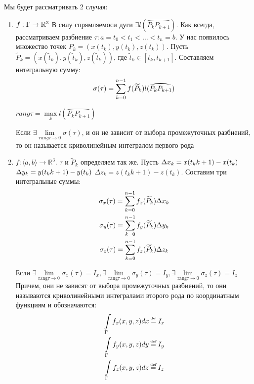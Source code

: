 Мы будет рассматривать 2 случая:
\begin{enumerate}
	\item
		$f: \Gamma \rightarrow \mathbb{R}^3\\$ 
		В силу спрямляемоси дуги $\exists l(\wideparen{P_k P_{k + 1}})$.
		Как всегда, рассматриваем разбиение $\tau: a = t_0 < t_1 < \dots < t_n = b$. 
		У нас появилось множество точек $P_k = (x(t_k), y(t_k), z(t_k))$.
		Пусть $\widetilde{P}_k = (x(\widetilde{t}_k), y(\widetilde{t}_k), z(\widetilde{t}_k))$, 
		где $\widetilde{t}_k \in [t_k, t_{k + 1}]$.
		Составляем интегральную сумму:
		\begin{gather}
			\sigma(\tau) = \sumlr{k = 0}{n - 1} f(\widetilde{P}_k)l(\wideparen{P_k P_{k + 1}})
		\end{gather}
		\begin{definition}
			$rang\tau = \max\limits_{k} l(\wideparen{P_k P_{k + 1}})$
		\end{definition}
		\begin{definition}
			Eсли $\exists \lim\limits_{rang\tau \rightarrow 0} \sigma(\tau)$, и он не зависит от 
			выбора промежуточных разбиений, то он называется криволинейным интегралом первого рода
		\end{definition}
	\item
		$f: \langle a, b \rangle \rightarrow \mathbb{R}^3$.
		$\tau$ и $\widetilde{P}_k$ определяем так же.
		Пусть $\Delta x_k = x(t_k{k + 1}) - x(t_k)\\$
		$\Delta y_k = y(t_k{k + 1}) - y(t_k)\\$
		$\Delta z_k = z(t_k{k + 1}) - z(t_k)$.
		Составим три интегральные суммы:
		\begin{gather}
			\sigma_x(\tau) = \sum\limits_{k = 0}^{n - 1}f_x(\widetilde{P}_k)\Delta x_k \\
			\sigma_y(\tau) = \sum\limits_{k = 0}^{n - 1}f_y(\widetilde{P}_k)\Delta y_k \\
			\sigma_z(\tau) = \sum\limits_{k = 0}^{n - 1}f_z(\widetilde{P}_k)\Delta z_k
		\end{gather}
		\begin{definition}
			Если $\exists \lim\limits_{\text{rang}\tau \rightarrow 0}\sigma_x(\tau) = I_x, 
			\exists \lim\limits_{\text{rang}\tau \rightarrow 0}\sigma_y(\tau) = I_y,
			\exists \lim\limits_{\text{rang}\tau \rightarrow 0}\sigma_z(\tau) = I_z$
			Причем, они не зависят от выбора промежуточных разбиений, 
			то они называются криволинейными интегралами второго рода по координатным функциям
			и обозначаются:
			\begin{gather*}
				\intl{\Gamma}f_x(x, y, z)dx \defeq I_x \\
				\intl{\Gamma}f_y(x, y, z)dy \defeq I_y \\
				\intl{\Gamma}f_z(x, y, z)dz \defeq I_z 
			\end{gather*}
		\end{definition}
\end{enumerate}

